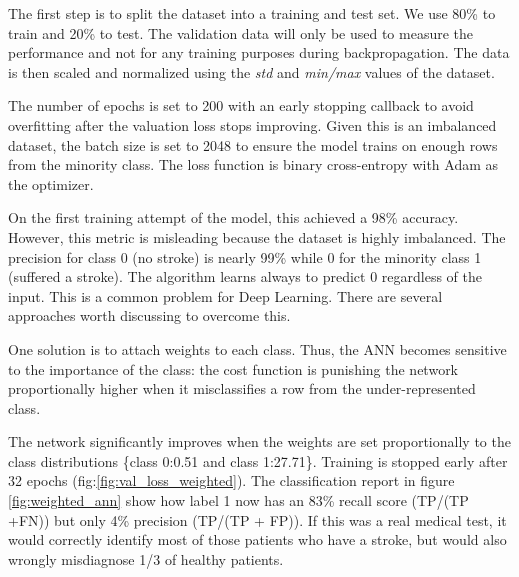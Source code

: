 \documentclass[proposal]{softeng}
\begin{document}
The first step is to split the dataset into a training and test set. We use 80\% to train and 20\% to test. The validation data will only be used to measure the performance and not for any training purposes during backpropagation. The data is then scaled and normalized using the \textit{std} and \textit{min/max} values of the dataset.

The number of epochs is set to 200 with an early stopping callback to avoid overfitting after the valuation loss stops improving. Given this is an imbalanced dataset, the batch size is set to 2048 to ensure the model trains on enough rows from the minority class. The loss function is binary cross-entropy with Adam as the optimizer.

On the first training attempt of the model, this achieved a 98\% accuracy. However, this metric is misleading because the dataset is highly imbalanced. The precision for class 0 (no stroke) is nearly 99\% while 0 for the minority class 1 (suffered a stroke). The algorithm learns always to predict 0 regardless of the input. This is a common problem for Deep Learning. There are several approaches worth discussing to overcome this.

One solution is to attach weights to each class\cite{cost_sensitive}\cite{WangS}. Thus, the ANN becomes sensitive to the importance of the class: the cost function is punishing the network proportionally higher when it misclassifies a row from the under-represented class.

The network significantly improves when the weights are set proportionally to the class distributions \{class 0:0.51 and class 1:27.71\}. Training is stopped early after 32 epochs (fig:\ref{fig:val_loss_weighted}).  The classification report in figure   \ref{fig:weighted_ann} show how label 1 now has an 83\% recall score (TP/(TP +FN)) but only 4\% precision (TP/(TP + FP)). If this was a real medical test, it would correctly identify most of those patients who have a stroke, but would also wrongly misdiagnose 1/3 of healthy patients.
\end{document}
